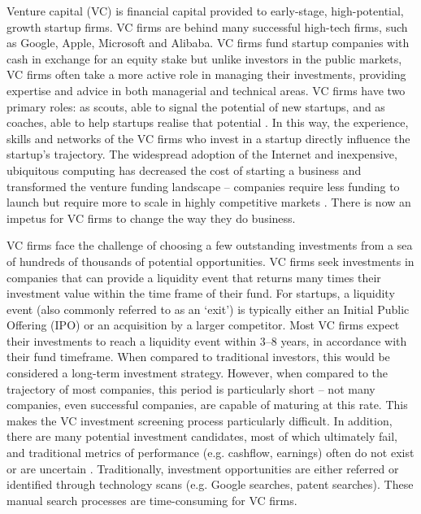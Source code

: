 \documentclass[../thesis/thesis.tex]{subfiles}
\begin{document}
Venture capital (VC) is financial capital provided to early-stage, high-potential, growth startup firms. VC firms are behind many successful high-tech firms, such as Google, Apple, Microsoft and Alibaba. VC firms fund startup companies with cash in exchange for an equity stake but unlike investors in the public markets, VC firms often take a more active role in managing their investments, providing expertise and advice in both managerial and technical areas. VC firms have two primary roles: as scouts, able to signal the potential of new startups, and as coaches, able to help startups realise that potential \cite{baum2004}. In this way, the experience, skills and networks of the VC firms who invest in a startup directly influence the startup’s trajectory. The widespread adoption of the Internet and inexpensive, ubiquitous computing has decreased the cost of starting a business and transformed the venture funding landscape -- companies require less funding to launch but require more to scale in highly competitive markets \cite{graham2013}. There is now an impetus for VC firms to change the way they do business.

VC firms face the challenge of choosing a few outstanding investments from a sea of hundreds of thousands of potential opportunities. VC firms seek investments in companies that can provide a liquidity event that returns many times their investment value within the time frame of their fund. For startups, a liquidity event (also commonly referred to as an `exit’) is typically either an Initial Public Offering (IPO) or an acquisition by a larger competitor. Most VC firms expect their investments to reach a liquidity event within 3--8 years, in accordance with their fund timeframe. When compared to traditional investors, this would be considered a long-term investment strategy. However, when compared to the trajectory of most companies, this period is particularly short -- not many companies, even successful companies, are capable of maturing at this rate. This makes the VC investment screening process particularly difficult. In addition, there are many potential investment candidates, most of which ultimately fail, and traditional metrics of performance (e.g. cashflow, earnings) often do not exist or are uncertain \cite{shane2002}. Traditionally, investment opportunities are either referred or identified through technology scans (e.g. Google searches, patent searches). These manual search processes are time-consuming for VC firms.
\end{document}
